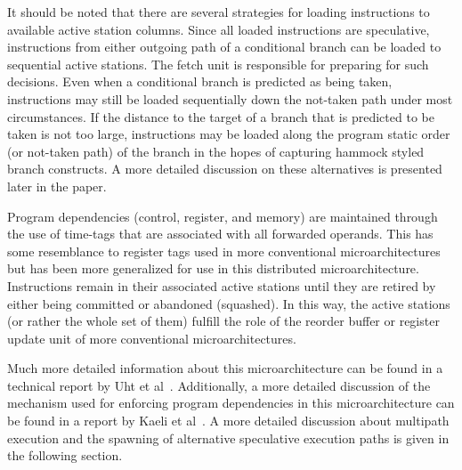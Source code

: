\documentclass[10pt,dvips]{article}
\begin{document}
It should be noted that there are several strategies for
loading instructions to available active station columns.
Since all loaded instructions are speculative, instructions
from either outgoing path of a conditional branch can be loaded
to sequential active stations.
The fetch unit is responsible for preparing for such decisions.
Even when a conditional branch is predicted as being taken,
instructions may still be loaded sequentially down the not-taken
path under most circumstances.  If the distance to the target 
of a branch
that is predicted to be taken is not too large,
instructions may be loaded along the program static order (or not-taken
path) of the branch in the hopes of capturing hammock styled branch
constructs.  A more detailed discussion on these alternatives is
presented later in the paper.

Program dependencies (control, register, and memory) are 
maintained through the use of time-tags that
are associated with all forwarded operands.
This has some resemblance to register tags used in more conventional 
microarchitectures but has been more generalized for use in this
distributed microarchitecture.  Instructions remain in their
associated active stations until they are retired by either being
committed or abandoned (squashed).  In this way, the active stations
(or rather the whole set of them)
fulfill the role of the reorder buffer or register update unit of more
conventional microarchitectures.

Much more detailed information about this microarchitecture
can be found in a technical report by Uht et al~\cite{Uht01}.
Additionally, a more detailed discussion of the mechanism used for
enforcing program dependencies in this microarchitecture
can be found in a report by Kaeli et al~\cite{Kaeli01}.
A more detailed discussion about multipath execution and
the spawning of alternative speculative execution paths is given
in the following section.
%
%
\end{document}
